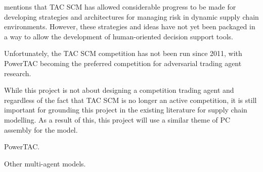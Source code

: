  mentions that TAC SCM has allowed considerable pro\-gress to be made for developing strategies and architectures for managing risk in dynamic supply chain environments.
However, these strategies and ideas have not yet been packaged in a way to allow the development of human-oriented decision support tools.

Unfortunately, the TAC SCM competition has not been run since 2011, with PowerTAC becoming the preferred competition for adversarial trading agent research.

While this project is not about designing a competition trading agent and regardless of the fact that TAC SCM is no longer an active competition, it is still important for grounding this project in the existing literature for supply chain modelling.
As a result of this, this project will use a similar theme of PC assembly for the model.

PowerTAC\@.

Other multi-agent models.
